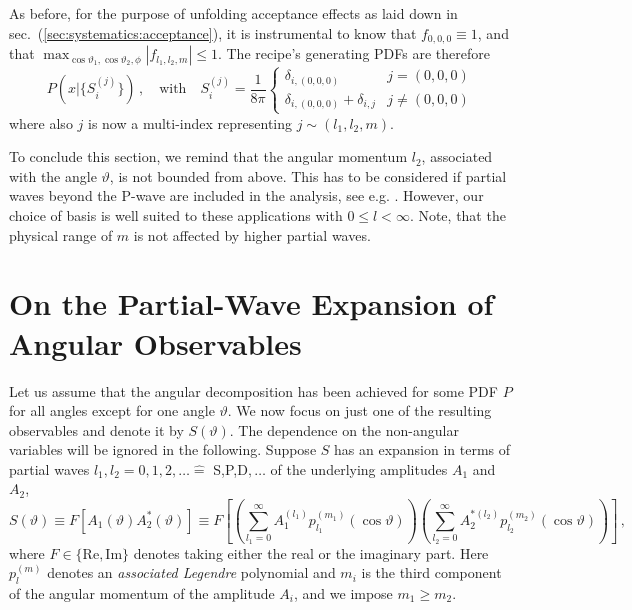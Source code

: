 \documentclass[aps,prd,reprint,nofootinbib,preprintnumbers]{revtex4}
\newcommand{\refsec}[1]{sec.~(\ref{sec:#1})}
\renewcommand{\theta}{\vartheta}
\begin{document}
As before, for the purpose of unfolding acceptance effects as laid down in \refsec{systematics:acceptance}, it is instrumental
to know that $f_{0,0,0} \equiv 1$, and that $\max_{\cos\theta_1,\cos\theta_2,\phi} |f_{l_1, l_2, m}| \leq 1$.
The recipe's generating PDFs are therefore
\begin{equation}
    \label{eq:recipe:btokstarll}
    P(x|\lbrace S_i^{(j)}\rbrace)\,,\quad\text{with}\quad S_i^{(j)} = \frac{1}{8\pi}
        \begin{cases}
            \delta_{i,(0,0,0)}                  & j = (0, 0, 0)\\
            \delta_{i,(0,0,0)}  + \delta_{i,j}  & j \neq (0, 0, 0)
        \end{cases}
\end{equation}
where also $j$ is now a multi-index representing $j \sim (l_1, l_2, m)$.

To conclude this section, we remind that the angular momentum $l_2$, associated with the angle $\theta$, is not bounded from above.
This has to be considered if partial waves beyond the P-wave are included in the analysis, see e.g. \cite{Das:2014sra}.
However, our choice of basis is well suited to these applications with $0 \leq l < \infty$. Note, that the
physical range of $m$ is not affected by higher partial waves.


\section{On the Partial-Wave Expansion of Angular Observables}
\label{app:partial-waves}

Let us assume that the angular decomposition has been achieved for
some PDF $P$ for all angles except for one angle $\theta$. We now
focus on just one of the resulting observables and denote it by
$S(\theta)$. The dependence on the non-angular variables will be
ignored in the following. Suppose $S$
has an expansion in terms of partial waves $l_1, l_2 = 0,1,2,\dots
\hat{=}$ S,P,D$,\dots$ of the underlying amplitudes $A_1$ and $A_2$,
\begin{equation}
    \label{eq:def-partial-wave-observable}
    S(\theta) \equiv F\left[A_1(\theta) A_2^*(\theta)\right] \equiv F\left[\left(\sum_{l_1=0}^\infty A_1^{(l_1)} p_{l_1}^{(m_1)}(\cos\theta)\right) \left(\sum_{l_2=0}^\infty A_2^{*(l_2)} p_{l_2}^{(m_2)}(\cos\theta)\right)\right]\,,
\end{equation}
where $F \in \{\text{Re},\text{Im}\}$ denotes taking either the real
or the imaginary part. Here $p_{l}^{(m)}$ denotes an \emph{associated Legendre} polynomial and $m_i$ is the third component of the angular momentum of the amplitude $A_i$, and we impose $m_1 \geq m_2$.\\
\end{document}
